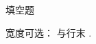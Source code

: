 \documentclass{article}
\begin{document}
\makehead
\begin{makepart}{填空题}
\begin{problem}[3]
  宽度可选： 与行末 .
\end{problem}
\end{makepart}
\end{document}
